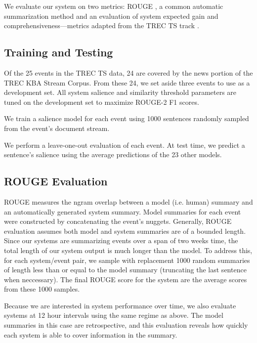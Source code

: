 We evaluate our system on two metrics: ROUGE \cite{lin2004rouge}, a common automatic
summarization method and an evaluation of system expected gain 
and comprehensiveness---metrics adapted 
from the TREC TS track \cite{aslam2013trec}.


\subsection{Training and Testing}

Of the 25 events in the TREC TS data, 24 are covered by the news portion 
of the TREC KBA Stream Corpus.
From these 24, we set aside three events to use as a development set.
All system salience and similarity threshold parameters are tuned on the
development set to maximize ROUGE-2 F1 scores.

We train a salience model for each event using 1000 sentences randomly sampled
from the event's document stream. 

We perform a leave-one-out evaluation of each event.
At test time, we predict a sentence's salience using the average predictions
of the 23 other models.   

\subsection{ROUGE Evaluation}

ROUGE measures the ngram overlap between a model (i.e. human) summary 
and an automatically generated system summary. 
Model summaries for each event were constructed by concatenating the event's 
nuggets. 
Generally, ROUGE evaluation assumes both model and system summaries
are of a bounded length. Since our systems are summarizing events over a span
of two weeks time, the total length of our system output is much longer than
the model. To address this, for each system/event pair, we sample with replacement
1000 random summaries of length less than or equal to the model summary 
(truncating the last sentence when neccessary). The final ROUGE score for the 
system are the average scores from these 1000 samples.

Because we are interested in system performance over time, we also evaluate 
systems at 12 hour intervals using the same regime as above. 
The model summaries in this case are retrospective, 
and this evaluation reveals how quickly each system is able to cover  information in the summary.


